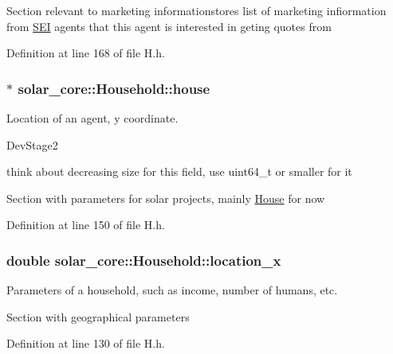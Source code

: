 Section relevant to marketing informationstores list of marketing infiormation from \hyperlink{classsolar__core_1_1_s_e_i}{S\+E\+I} agents that this agent is interested in geting quotes from 

Definition at line 168 of file H.\+h.

\hypertarget{classsolar__core_1_1_household_a1104d8264fe733937e1fd2e9ad0f8fc1}{}
\subsubsection[{house}]{$\ast$ solar\+\_\+core\+::\+Household\+::house\hspace{0.3cm}{\ttfamily [protected]}}\label{classsolar__core_1_1_household_a1104d8264fe733937e1fd2e9ad0f8fc1}
Location of an agent, y coordinate.\begin{DoxyRefDesc}{Dev\+Stage2}
\item[\hyperlink{_dev_stage2__DevStage2000005}{Dev\+Stage2}]think about decreasing size for this field, use uint64\+\_\+t or smaller for it \end{DoxyRefDesc}


Section with parameters for solar projects, mainly \hyperlink{classsolar__core_1_1_house}{House} for now 

Definition at line 150 of file H.\+h.

\hypertarget{classsolar__core_1_1_household_a6596375631a366fdd24270f75548841f}{}
\subsubsection[{location\+\_\+x}]{\setlength{\rightskip}{0pt plus 5cm}double solar\+\_\+core\+::\+Household\+::location\+\_\+x\hspace{0.3cm}{\ttfamily [protected]}}\label{classsolar__core_1_1_household_a6596375631a366fdd24270f75548841f}
Parameters of a household, such as income, number of humans, etc.

Section with geographical parameters 

Definition at line 130 of file H.\+h.

